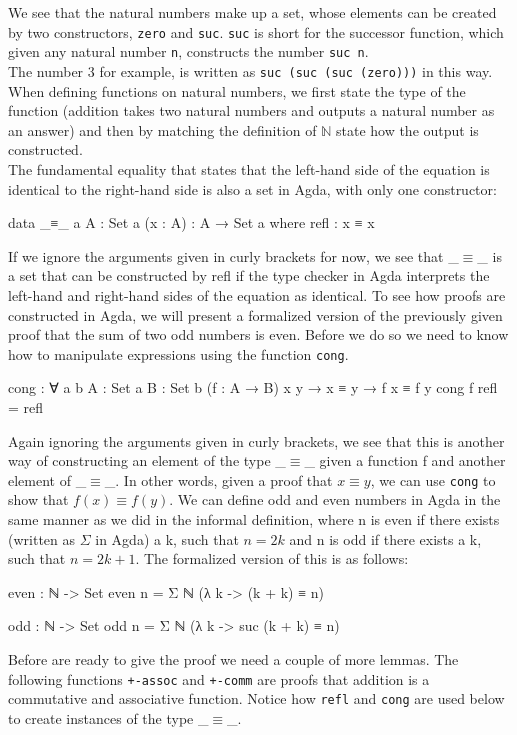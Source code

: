 \documentclass[11pt,a4paper]{article}
\begin{document}
We see that the natural numbers make up a set, whose elements can be created by two constructors, \texttt{zero} and \texttt{suc}. \texttt{suc} is short for the successor function, which given any natural number \texttt{n}, constructs the number \texttt{suc n}. \\
The number 3 for example, is written as \texttt{suc (suc (suc (zero)))} in this way. When defining functions on natural numbers, we first state the type of the function (addition takes two natural numbers and outputs a natural number as an answer) and then by matching the definition of $\mathbb{N}$ state how the output is constructed.\\
The fundamental equality that states that the left-hand side of the equation is identical to the right-hand side is also a set in Agda, with only one constructor:
\begin{code}
data _≡_ {a} {A : Set a} (x : A) : A → Set a where
   refl : x ≡ x
\end{code}
If we ignore the arguments given in curly brackets for now, we see that \_$\equiv$\_ is a set that can be constructed by refl if the type checker in Agda interprets the left-hand and right-hand sides of the equation as identical.
To see how proofs are constructed in Agda, we will present a formalized version of the previously given proof that the sum of two odd numbers is even. Before we do so we need to know how to manipulate expressions using the function \texttt{cong}.
\begin{code}
cong : ∀ {a b} {A : Set a} {B : Set b}
       (f : A → B) {x y} → x ≡ y → f x ≡ f y
cong f refl = refl
\end{code}
Again ignoring the arguments given in curly brackets, we see that this is another way of constructing an element of the type \_$\equiv$\_ given a function f and another element of \_$\equiv$\_. In other words, given a proof that $x \equiv y$, we can use \texttt{cong} to show that $f(x) \equiv f(y)$.
We can define odd and even numbers in Agda in the same manner as we did in the informal definition, where n is even if there exists (written as $\Sigma$ in Agda) a k, such that $n = 2k$ and n is odd if there exists a k, such that $n = 2k + 1$. The formalized version of this is as follows:
\begin{code}
even : ℕ -> Set
even n = Σ ℕ (λ k -> (k + k) ≡ n)
 
odd : ℕ -> Set
odd n = Σ ℕ (λ k -> suc (k + k) ≡ n)
\end{code}
Before are ready to give the proof we need a couple of more lemmas. The following functions \texttt{+-assoc} and \texttt{+-comm} are proofs that addition is a commutative and associative function. Notice how \texttt{refl} and \texttt{cong} are used below to create instances of the type \_$\equiv$\_.
\end{document}
